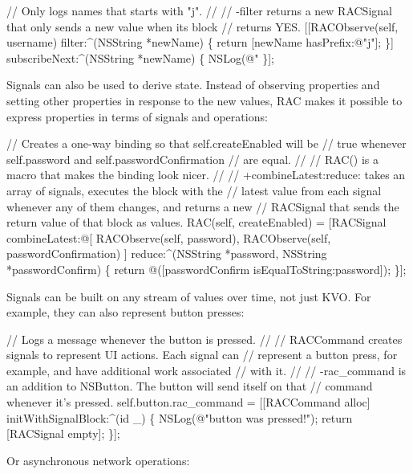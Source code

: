 \begin{DoxyCode}
// Only logs names that starts with "j".
//
// -filter returns a new RACSignal that only sends a new value when its block
// returns YES.
[[RACObserve(self, username)
    filter:^(NSString *newName) \{
        return [newName hasPrefix:@"j"];
    \}]
    subscribeNext:^(NSString *newName) \{
        NSLog(@"%
    \}];
\end{DoxyCode}


Signals can also be used to derive state. Instead of observing properties and setting other properties in response to the new values, R\+AC makes it possible to express properties in terms of signals and operations\+:


\begin{DoxyCode}
// Creates a one-way binding so that self.createEnabled will be
// true whenever self.password and self.passwordConfirmation
// are equal.
//
// RAC() is a macro that makes the binding look nicer.
// 
// +combineLatest:reduce: takes an array of signals, executes the block with the
// latest value from each signal whenever any of them changes, and returns a new
// RACSignal that sends the return value of that block as values.
RAC(self, createEnabled) = [RACSignal 
    combineLatest:@[ RACObserve(self, password), RACObserve(self, passwordConfirmation) ] 
    reduce:^(NSString *password, NSString *passwordConfirm) \{
        return @([passwordConfirm isEqualToString:password]);
    \}];
\end{DoxyCode}


Signals can be built on any stream of values over time, not just K\+VO. For example, they can also represent button presses\+:


\begin{DoxyCode}
// Logs a message whenever the button is pressed.
//
// RACCommand creates signals to represent UI actions. Each signal can
// represent a button press, for example, and have additional work associated
// with it.
//
// -rac\_command is an addition to NSButton. The button will send itself on that
// command whenever it's pressed.
self.button.rac\_command = [[RACCommand alloc] initWithSignalBlock:^(id \_) \{
    NSLog(@"button was pressed!");
    return [RACSignal empty];
\}];
\end{DoxyCode}


Or asynchronous network operations\+:


